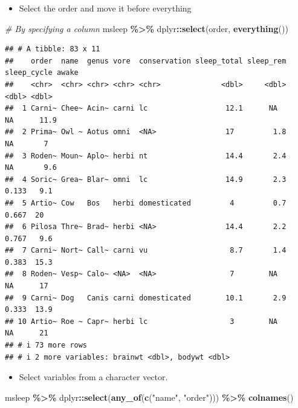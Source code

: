 \documentclass[
]{book}
\newenvironment{Shaded}{\begin{snugshade}}{\end{snugshade}}
\newcommand{\CommentTok}[1]{\textcolor[rgb]{0.56,0.35,0.01}{\textit{#1}}}
\newcommand{\FunctionTok}[1]{\textcolor[rgb]{0.13,0.29,0.53}{\textbf{#1}}}
\newcommand{\NormalTok}[1]{#1}
\newcommand{\SpecialCharTok}[1]{\textcolor[rgb]{0.81,0.36,0.00}{\textbf{#1}}}
\newcommand{\StringTok}[1]{\textcolor[rgb]{0.31,0.60,0.02}{#1}}
\providecommand{\tightlist}{%
  \setlength{\itemsep}{0pt}\setlength{\parskip}{0pt}}
\begin{document}
\begin{itemize}
\tightlist
\item
  Select the order and move it before everything
\end{itemize}

\begin{Shaded}
\begin{Highlighting}[]
\CommentTok{\# By specifying a column}
\NormalTok{msleep }\SpecialCharTok{\%\textgreater{}\%}
\NormalTok{  dplyr}\SpecialCharTok{::}\FunctionTok{select}\NormalTok{(order, }\FunctionTok{everything}\NormalTok{())}
\end{Highlighting}
\end{Shaded}

\begin{verbatim}
## # A tibble: 83 x 11
##    order  name  genus vore  conservation sleep_total sleep_rem sleep_cycle awake
##    <chr>  <chr> <chr> <chr> <chr>              <dbl>     <dbl>       <dbl> <dbl>
##  1 Carni~ Chee~ Acin~ carni lc                  12.1      NA        NA      11.9
##  2 Prima~ Owl ~ Aotus omni  <NA>                17         1.8      NA       7  
##  3 Roden~ Moun~ Aplo~ herbi nt                  14.4       2.4      NA       9.6
##  4 Soric~ Grea~ Blar~ omni  lc                  14.9       2.3       0.133   9.1
##  5 Artio~ Cow   Bos   herbi domesticated         4         0.7       0.667  20  
##  6 Pilosa Thre~ Brad~ herbi <NA>                14.4       2.2       0.767   9.6
##  7 Carni~ Nort~ Call~ carni vu                   8.7       1.4       0.383  15.3
##  8 Roden~ Vesp~ Calo~ <NA>  <NA>                 7        NA        NA      17  
##  9 Carni~ Dog   Canis carni domesticated        10.1       2.9       0.333  13.9
## 10 Artio~ Roe ~ Capr~ herbi lc                   3        NA        NA      21  
## # i 73 more rows
## # i 2 more variables: brainwt <dbl>, bodywt <dbl>
\end{verbatim}

\begin{itemize}
\tightlist
\item
  Select variables from a character vector.
\end{itemize}

\begin{Shaded}
\begin{Highlighting}[]
\NormalTok{msleep }\SpecialCharTok{\%\textgreater{}\%}
\NormalTok{  dplyr}\SpecialCharTok{::}\FunctionTok{select}\NormalTok{(}\FunctionTok{any\_of}\NormalTok{(}\FunctionTok{c}\NormalTok{(}\StringTok{"name"}\NormalTok{, }\StringTok{"order"}\NormalTok{))) }\SpecialCharTok{\%\textgreater{}\%}
  \FunctionTok{colnames}\NormalTok{()}
\end{Highlighting}
\end{Shaded}
\end{document}
